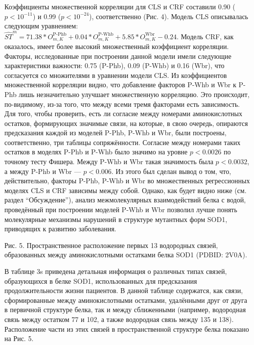 Коэффициенты множественной корреляции для CLS и CRF составили 0.90 ($p < 10^{-11}$) и 0.99 ($p < 10^{-24}$), соответственно (Рис. 4). Модель CLS описывалась следующим уравнением:  $\widehat{ST}^m = 71.38*O_{m, K}^{\text{P-Phb}}+0.04*O_{m, K}^{\text{P-Whb}}+5.85*O_{m, K}^{\text{Wbr}}-0.24$. Модель CRF, как оказалось, имеет более высокий множественный коэффициент корреляции. Факторы, исследованные при построении данной модели имели следующие характеристики важности: 0.75 (P-Phb), 0.09 (P-Whb) и 0.16 (Wbr), что согласуется со множителями в уравнении модели CLS.
Из коэффициентов множественной корреляции видно, что добавление факторов P-Whb и Wbr к P-Phb лишь незначительно улучшает множественную корреляцию. Это происходит, по-видимому, из-за того, что между всеми тремя факторами есть зависимость. Для того, чтобы проверить, есть ли согласие между номерами аминокислотных остатков, формирующих значимые связи, на которые, в свою очередь, опираются предсказания каждой из моделей P-Phb, P-Whb и Wbr, были построены, соответственно, три таблицы сопряжённости. Согласие между номерами таких остатков в моделях P-Phb и P-Whb было значимо на уровне $p < 0.0026$ по точному тесту Фишера. Между P-Whb и Wbr такая значимость была $p < 0.0032$, а между P-Phb и Wbr — $p < 0.006$. Из этого был сделан вывод о том, что, действительно, факторы P-Phb, P-Whb и Wbr во множественных регрессионных моделях CLS и CRF зависимы между собой. Однако, как будет видно ниже (см. раздел “Обсуждение”), анализ межмолекулярных взаимодействий белка с водой, проведённый при построении моделей P-Whb и Wbr позволил лучше понять молекулярные механизмы нарушений в структуре мутантных форм SOD1, приводящих к развитию заболевания.

Рис. 5. Пространственное расположение первых 13 водородных связей, образованных между аминокислотными остатками белка SOD1 (PDBID: 2V0A).

В таблице 3s приведена детальная информация о различных типах связей, образующихся в белке SOD1, использованных для предсказания продолжительности жизни пациентов. В данной таблице содержатся, как связи, сформированные между аминокислотными остатками, удалёнными друг от друга в первичной структуре белка, так и между сближенными (например, водородная связь между остатком 77 и 102, а также водородная связь между 135 и 138). Расположение части из этих связей в пространственной структуре белка показано на Рис. 5.  


